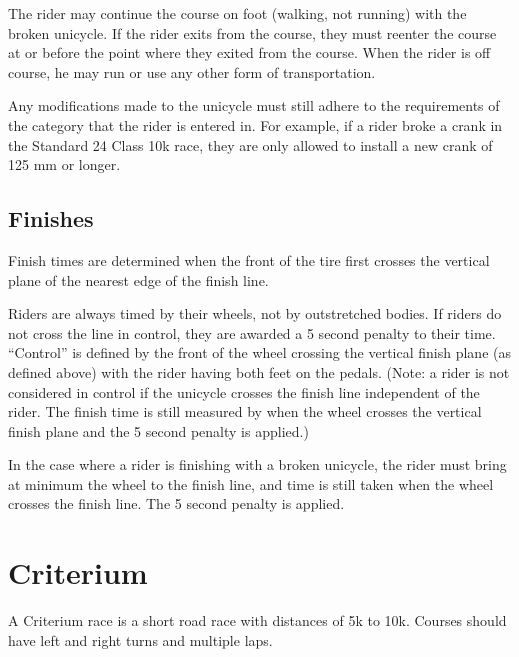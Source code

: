 The rider may continue the course on foot (walking, not running) with the broken unicycle.
If the rider exits from the course, they must reenter the course at or before the point where they exited from the course.
When the rider is off course, he may run or use any other form of transportation.

Any modifications made to the unicycle must still adhere to the requirements of the category that the rider is entered in.
For example, if a rider broke a crank in the Standard 24 Class 10k race, they are only allowed to install a new crank of 125 mm or longer.


\subsection{Finishes}

Finish times are determined when the front of the tire first crosses the vertical plane of the nearest edge of the finish line.

Riders are always timed by their wheels, not by outstretched bodies.
If riders do not cross the line in control, they are awarded a 5 second penalty to their time.
``Control'' is defined by the front of the wheel crossing the vertical finish plane (as defined above) with the rider having both feet on the pedals.
(Note: a rider is not considered in control if the unicycle crosses the finish line independent of the rider.
The finish time is still measured by when the wheel crosses the vertical finish plane and the 5 second penalty is applied.)

In the case where a rider is finishing with a broken unicycle, the rider must bring at minimum the wheel to the finish line, and time is still taken when the wheel crosses the finish line.
The 5 second penalty is applied.

\section{Criterium}
A Criterium race is a short road race with distances of 5k to 10k.
Courses should have left and right turns and multiple laps.
